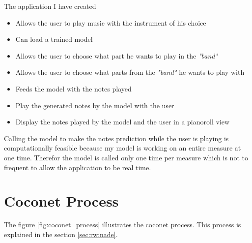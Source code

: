 \documentclass[12pt]{report}
\begin{document}
The application I have created
\begin{itemize}
    \item Allows the user to play music with the instrument of his choice
    \item Can load a trained model
    \item Allows the user to choose what part he wants to play in the \textit{"band"}
    \item Allows the user to choose what parts from the \textit{"band"} he wants to play with
    \item Feeds the model with the notes played 
    \item Play the generated notes by the model with the user
    \item Display the notes played by the model and the user in a pianoroll view
\end{itemize}

Calling the model to make the notes prediction while the user is playing is computationally feasible because my model is working on an entire measure at one time.
Therefor the model is called only one time per measure which is not to frequent to allow the application to be real time.


\section{Coconet Process}
\label{appendix:coconet_process}

The figure \ref{fig:coconet_process} illustrates the coconet process.
This process is explained in the section \ref{sec:rw:nade}.
\end{document}
